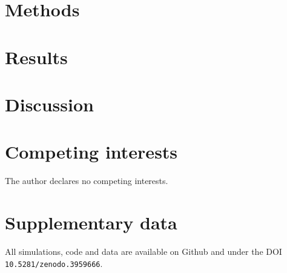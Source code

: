 \documentclass{article}
\begin{document}

\section{Methods} %
\label{sec:methods}


\section{Results} %
\label{sec:results}


\section{Discussion} %
\label{sec:discussion}


\section*{Competing interests} %
\label{sec:competing_interests}

The author declares no competing interests.


\section*{Supplementary data} %
\label{sec:supplementary_data}

All simulations, code and data are available on Github and under the DOI \texttt{10.5281/zenodo.3959666}.



\end{document}
